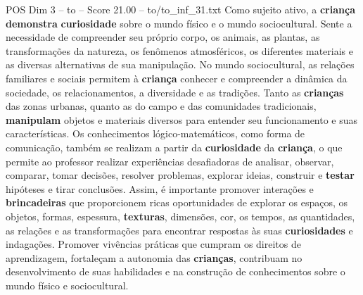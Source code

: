 \begin{textsample}{POS Dim 3 – to – Score 21.00 – to/to\_inf\_31.txt}
Como sujeito ativo, a \textbf{criança} \textbf{demonstra} \textbf{curiosidade} sobre o mundo físico e o mundo sociocultural.
Sente a necessidade de compreender seu próprio corpo, os animais, as plantas, as transformações da natureza, os fenômenos atmosféricos, os diferentes materiais e as diversas alternativas de sua manipulação.
No mundo sociocultural, as relações familiares e sociais permitem à \textbf{criança} conhecer e compreender a dinâmica da sociedade, os relacionamentos, a diversidade e as tradições.
Tanto as \textbf{crianças} das zonas urbanas, quanto as do campo e das comunidades tradicionais, \textbf{manipulam} objetos e materiais diversos para entender seu funcionamento e suas características.
Os conhecimentos lógico-matemáticos, como forma de comunicação, também se realizam a partir da \textbf{curiosidade} da \textbf{criança}, o que permite ao professor realizar experiências desafiadoras de analisar, observar, comparar, tomar decisões, resolver problemas, explorar ideias, construir e \textbf{testar} hipóteses e tirar conclusões.
Assim, é importante promover interações e \textbf{brincadeiras} que proporcionem ricas oportunidades de explorar os espaços, os objetos, formas, espessura, \textbf{texturas}, dimensões, cor, os tempos, as quantidades, as relações e as transformações para encontrar respostas às suas \textbf{curiosidades} e indagações.
Promover vivências práticas que cumpram os direitos de aprendizagem, fortaleçam a autonomia das \textbf{crianças}, contribuam no desenvolvimento de suas habilidades e na construção de conhecimentos sobre o mundo físico e sociocultural.

\end{textsample}
